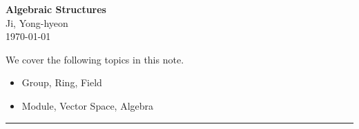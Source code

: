 \documentclass[11pt,openany]{article}
\begin{document}
\begin{center}
	\huge\textbf{Algebraic Structures}\\
	\vspace{0.5em}
	\large{Ji, Yong-hyeon}\\
	\vspace{0.5em}
	\normalsize{\today}\\
\end{center}

\noindent 
We cover the following topics in this note.
\begin{itemize}
	\item Group, Ring, Field
	\item Module, Vector Space, Algebra
\end{itemize}
\hrule\vspace{12pt}
\end{document}
